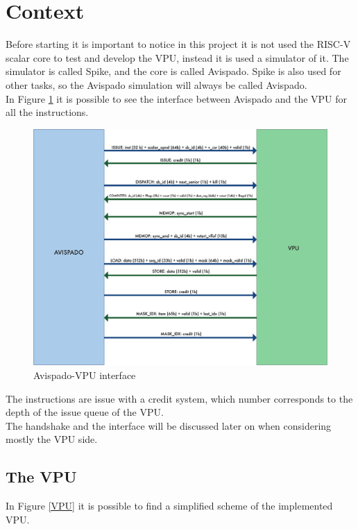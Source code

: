 \section{Context}
Before starting it is important to notice in this project it is not used the RISC-V scalar core to test and develop the VPU, instead it is used a simulator of it. The simulator is called Spike, and the core is called Avispado. Spike is also used for other tasks, so the Avispado simulation will always be called Avispado.\\
In Figure \ref{avi-vpu} it is possible to see the interface between Avispado and the VPU for all the instructions.\\
\begin{figure}[H]
    \centering
    \includegraphics[scale = 0.6]{Chapter_1/img/avi-vpu.png}
    \caption{Avispado-VPU interface}
    \label{avi-vpu}
\end{figure}


The instructions are issue with a credit system, which number corresponds to the  depth of the issue queue of the VPU.\\

The handshake and the interface will be discussed later on when considering mostly the VPU side.



\subsection{The VPU}
In Figure \ref{VPU} it is possible to find a simplified scheme of the implemented VPU.\\

